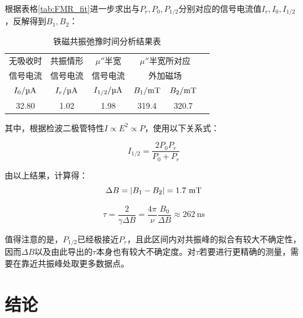 \documentclass{thuemp}
\begin{document}
    根据表格\ref{tab:FMR_fit}进一步求出与$P_r, P_0, P_{1/2}$分别对应的信号电流值$I_r, I_0, I_{1/2}$，反解得到$B_{1}, B_{2}$：
    
    \begin{table}[H]
        \centering
        \captionnamefont{\wuhao\bf\heiti}
        \captiontitlefont{\wuhao\bf\heiti}
        \caption{铁磁共振弛豫时间分析结果表} \label{tab:FMR_relax}
        \liuhao
        \begin{tabular}{cccccc}
            \toprule
            无吸收时 & 共振情形 & $\mu''$半宽 &
                \multicolumn{2}{c}{$\mu''$半宽所对应}\\
            信号电流 & 信号电流 & 信号电流     &  
                \multicolumn{2}{c}{外加磁场}\\
            $I_{0}/\text{\si{\micro\ampere}}$ & 
                $I_{r}/\text{\si{\micro\ampere}}$ &
                $I_{1/2}/\text{\si{\micro\ampere}}$&
                $B_1/\text{\si{\milli\tesla}}$ &
                $B_2/\text{\si{\milli\tesla}}$ \\ 
            \midrule
            32.80& 1.02 & 1.98 & 319.4 & 320.7 \\
            \bottomrule
        \end{tabular}
    \end{table}
    
    其中，根据检波二极管特性$I \propto E^2 \propto P$，使用以下关系式：
    
    \begin{equation}
        I_{1/2} = \frac{2P_0P_r}{P_0+P_r}
    \end{equation}
    
    由以上结果，计算得：
    \begin{equation}
        \Delta B = |B_1 - B_2| = 1.7 ~\text{\si{\milli\tesla}}
    \end{equation}
    
    \begin{equation}
        \tau = \frac{2}{\gamma\Delta B}
             = \frac{4\pi}{\nu}\frac{B_0}{\Delta B}
             \approx 262 ~ \text{ns}
    \end{equation}
    
    值得注意的是，$P_{1/2}$已经极接近$P_r$，且此区间内对共振峰的拟合有较大不确定性，因而$\Delta B$以及由此导出的$\tau$本身也有较大不确定度。对$\tau$若要进行更精确的测量，需要在靠近共振峰处取更多数据点。
    
    \section{结论}
    
\end{document}
